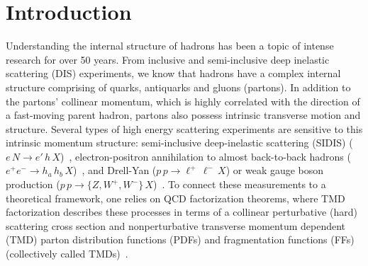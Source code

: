 \documentclass[final,3p,times,onecolumn,sort&compress,hidelinks]{elsarticle}
\begin{document}
\date{\today}


\section{Introduction}
\label{s:intro}

Understanding the internal structure of hadrons has been a topic of
intense research for over 50 years.  From inclusive and semi-inclusive
deep inelastic scattering (DIS) experiments, we know that hadrons have
a complex internal structure comprising of quarks, antiquarks and gluons
(partons). In addition to the partons' collinear momentum, which is
highly correlated with the direction of a fast-moving parent hadron,
partons also possess intrinsic transverse motion and structure.
%
Several types of high energy scattering experiments are sensitive to
this intrinsic momentum structure: 
  semi-inclusive deep-inelastic scattering (SIDIS)
($e\, N \to e'\, h\,X$)~\cite{Kotzinian:1994dv},
  electron-positron annihilation to almost back-to-back hadrons
($e^+ e^- \to h_a\, h_b\, X$)~\cite{Boer:1997mf},
  and Drell-Yan ($p\, p \to \ell^+\, \ell^-\,X$) or weak gauge boson
production ($p\,p\to \{Z, W^+, W^-\}\,X$)~\cite{Tangerman:1994eh}.
%
To connect these measurements to a theoretical framework, one relies
on QCD factorization theorems, where TMD factorization
\cite{Collins:1981uw, Ji:2004wu, Collins:2011zzd} describes these
processes in terms of a collinear perturbative (hard) scattering
cross section and nonperturbative transverse momentum dependent (TMD)
parton distribution functions (PDFs) and fragmentation functions (FFs)
(collectively called TMDs)~\cite{Kotzinian:1994dv, Mulders:1995dh,
Boer:1997nt}.


\end{document}
